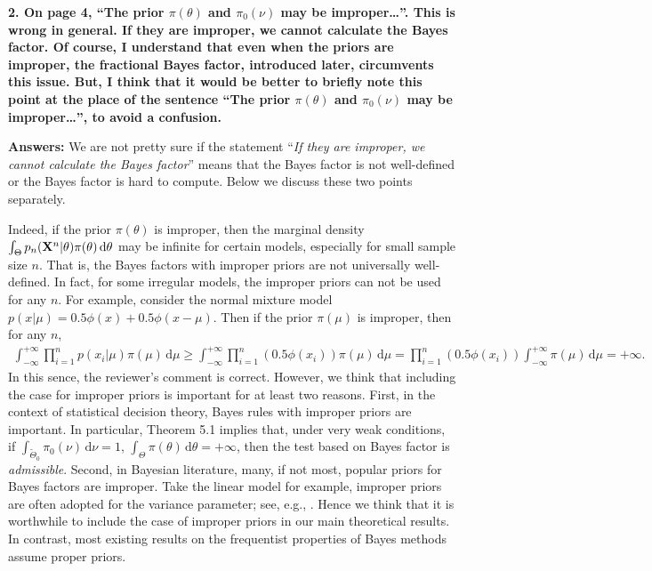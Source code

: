 \documentclass[11pt]{article}
\theoremstyle{plain}
\theoremstyle{definition}
\theoremstyle{remark}
\begin{document}
\textbf{
    2.
    On page 4, ``The prior $\pi(\theta)$ and $\pi_0 (\nu)$ may be improper\dots''.
    This is wrong in general.
    If they are improper, we cannot calculate the Bayes factor.
    Of course, I understand that even when the priors are improper, the fractional Bayes factor, introduced later, circumvents this issue.
    But, I think that it would be better to briefly note this point at the place of the sentence ``The prior $\pi(\theta)$ and $\pi_0 (\nu)$ may be improper\dots'', to avoid a confusion.
}

\textbf{Answers:}
We are not pretty sure if the statement ``\emph{If they are improper, we cannot calculate the Bayes factor}'' means that the Bayes factor is not well-defined or the Bayes factor is hard to compute.
Below we discuss these two points separately.

Indeed, if the prior $\pi(\theta)$ is improper, then the marginal density $\int_{\Theta} p_n (\mathbf{X}^n | \theta) \pi(\theta) \, \mathrm d \theta$ may be infinite for certain models, especially for small sample size $n$.
That is, the Bayes factors with improper priors are not universally well-defined.
In fact, for some irregular models, the improper priors can not be used for any $n$.
For example, consider the normal mixture model $p(x| \mu ) = 0.5 \phi(x) + 0.5 \phi(x-\mu)$.
Then if the prior $\pi(\mu)$ is improper, then for any $n$,
\begin{align*}
    \int_{-\infty}^{+\infty}
    \prod_{i=1}^n p(x_i | \mu) \pi(\mu) \, \mathrm d \mu
    \geq
    \int_{-\infty}^{+\infty}
    \prod_{i=1}^n (0.5\phi(x_i)) \pi(\mu) \, \mathrm d \mu
    =
\prod_{i=1}^n (0.5\phi(x_i))
    \int_{-\infty}^{+\infty}
     \pi(\mu) \, \mathrm d \mu
     =+\infty.
\end{align*}
In this sence, the reviewer's comment is correct.
However, we think that including the case for improper priors is important for at least two reasons.
First, in the context of statistical decision theory, Bayes rules with improper priors are important.
In particular, \cite{Farrell1968Towards} Theorem 5.1 implies that, under very weak conditions, if $\int_{\tilde \Theta_0} \pi_0(\nu) \, \mathrm d \nu = 1$, $\int_\Theta \pi(\theta) \, \mathrm d \theta = +\infty$, then the test based on Bayes factor is \emph{admissible}.
Second, in Bayesian literature, many, if not most, popular priors for Bayes factors are improper.
Take the linear model for example, improper priors are often adopted for the variance parameter; see, e.g., \cite{Liang2008Mixtures}.
Hence we think that it is worthwhile to include the case of improper priors in our main theoretical results.
In contrast, most existing results on the frequentist properties of Bayes methods assume proper priors.
\end{document}
